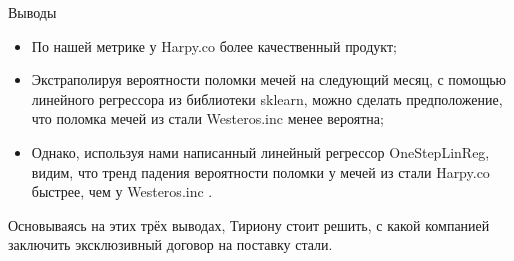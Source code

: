 \documentclass{beamer}
\begin{document}
\begin{frame}{Выводы}
    \begin{itemize}
        \item По нашей метрике у Harpy.co более качественный продукт;
        \item Экстраполируя вероятности поломки мечей на следующий месяц, с помощью линейного регрессора из библиотеки sklearn, можно сделать предположение, что поломка мечей из стали Westeros.inc менее вероятна;
        \item Однако, используя нами написанный линейный регрессор OneStepLinReg, видим, что тренд падения вероятности поломки у мечей из стали Harpy.co быстрее, чем у Westeros.inc . 
    \end{itemize}
    Основываясь на этих трёх выводах, Тириону стоит решить, с какой компанией заключить эксклюзивный договор на поставку стали.
\end{frame}
\end{document}
